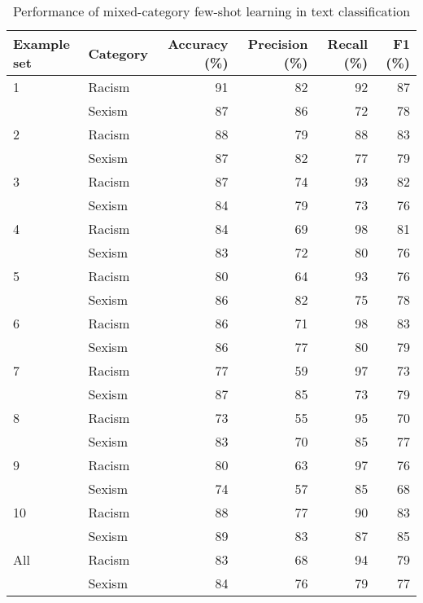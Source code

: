 \documentclass{bmcart}
\begin{document}
\begin{backmatter}
\begin{table}

\caption{\label{tab:fewshotmixed-summary}Performance of mixed-category few-shot learning in text classification}
\centering
\begin{tabular}[t]{llrrrr}
\hline
Example set & Category & Accuracy (\%) & Precision (\%) & Recall (\%) & F1 (\%)\\
\hline
1 & Racism & 91 & 82 & 92 & 87\\
 & Sexism & 87 & 86 & 72 & 78\\
\hline
2 & Racism & 88 & 79 & 88 & 83\\
 & Sexism & 87 & 82 & 77 & 79\\
\hline
3 & Racism & 87 & 74 & 93 & 82\\
 & Sexism & 84 & 79 & 73 & 76\\
\hline
4 & Racism & 84 & 69 & 98 & 81\\
 & Sexism & 83 & 72 & 80 & 76\\
\hline
5 & Racism & 80 & 64 & 93 & 76\\
 & Sexism & 86 & 82 & 75 & 78\\
\hline
6 & Racism & 86 & 71 & 98 & 83\\
 & Sexism & 86 & 77 & 80 & 79\\
\hline
7 & Racism & 77 & 59 & 97 & 73\\
 & Sexism & 87 & 85 & 73 & 79\\
\hline
8 & Racism & 73 & 55 & 95 & 70\\
 & Sexism & 83 & 70 & 85 & 77\\
\hline
9 & Racism & 80 & 63 & 97 & 76\\
 & Sexism & 74 & 57 & 85 & 68\\
\hline
10 & Racism & 88 & 77 & 90 & 83\\
 & Sexism & 89 & 83 & 87 & 85\\
\hline
All & Racism & 83 & 68 & 94 & 79\\
 & Sexism & 84 & 76 & 79 & 77\\
\hline
\end{tabular}
\end{table}


\begin{table}


\end{table}
\end{backmatter}
\end{document}
